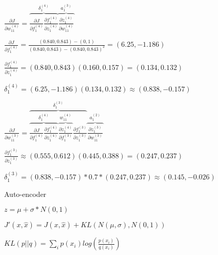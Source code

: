 \documentclass{KBook}
\begin{document}
	\begin{minipage}{0.45\textwidth} 
		\tiny
		$
		\frac{\partial J}{\partial w_{11}^{(4)}} = \overbrace{\frac{\partial J}{\partial f_{1}^{(4)}} \frac{\partial f_{1}^{(4)}}{\partial z_{1}^{(4)}}}^{\delta_{1}^{(4)}} \overbrace{\frac{\partial z_{1}^{(4)}}{\partial w_{11}^{(4)}}}^{a_{1}^{(3)}}
		$
		
		$ 
		\frac{\partial J}{\partial f_{1}^{(4)}} = \frac{(0.840, 0.843) - (0, 1)}{(0.840, 0.843) - (0.840, 0.843)^2} 
		= (6.25, -1.186)
		$
		
		$ 
		\frac{\partial f_{1}^{(4)}}{\partial z_{1}^{(4)}} = (0.840, 0.843) (0.160, 0.157) = (0.134, 0.132)
		$
		
		$
		\delta_{1}^{(4)} = (6.25, -1.186) (0.134, 0.132) \approx (0.838, -0.157)
		$ 
	\end{minipage}
	\begin{minipage}{0.54\textwidth} 
		\tiny
		$
		\frac{\partial J}{\partial w_{11}^{(3)}} = 
		\overbrace{
			\overbrace{
				\frac{\partial J}{\partial f_{1}^{(4)}} 
				\frac{\partial f_{1}^{(4)}}{\partial z_{1}^{(4)}}
			}^{\delta_{1}^{(4)}} 
			\overbrace{
				\frac{\partial z_{1}^{(4)}}{\partial f_{1}^{(3)}}
			}^{w_{11}^{(4)}} 
			\frac{\partial f_{1}^{(3)}}{\partial z_{1}^{(3)}} 
		}^{\delta_{1}^{(3)}} 
		\overbrace{
			\frac{\partial z_{1}^{(3)}}{\partial w_{11}^{(3)}}
		}^{a_{1}^{(2)}}
		$
		
		$
		\frac{\partial f_{1}^{(3)}}{\partial z_{1}^{(3)}} \approx 
		(0.555, 0.612) (0.445, 0.388) = (0.247, 0.237)
		$
		
		$
		\delta_{1}^{(3)} = (0.838, -0.157) * 0.7 * (0.247, 0.237) \approx (0.145, -0.026)
		$
	\end{minipage}
	
	
	Auto-encoder
	
	\begin{minipage}{0.47\textwidth}
	\end{minipage}
	\hfill
	\begin{minipage}{0.47\textwidth} 
	\end{minipage}
	
	\begin{minipage}{0.52\textwidth}
		\small
		$ z = \mu + \sigma * N(0, 1) $
		
		\vspace{6pt}$ J'(x, \hat{x}) = J(x, \hat{x}) + KL(N(\mu, \sigma), N(0, 1)) $
		
		\vspace{6pt}$ KL(p||q) = \sum_i p(x_i) log(\frac{p(x_i)}{q(x_i)}) $
	\end{minipage}
	\begin{minipage}{0.47\textwidth} 
	\end{minipage}
\end{document}
